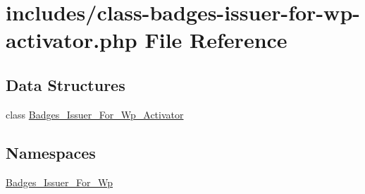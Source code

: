 \hypertarget{class-badges-issuer-for-wp-activator_8php}{}\section{includes/class-\/badges-\/issuer-\/for-\/wp-\/activator.php File Reference}
\label{class-badges-issuer-for-wp-activator_8php}
\subsection*{Data Structures}
\begin{DoxyCompactItemize}
\item 
class \hyperlink{class_badges___issuer___for___wp___activator}{Badges\+\_\+\+Issuer\+\_\+\+For\+\_\+\+Wp\+\_\+\+Activator}
\end{DoxyCompactItemize}
\subsection*{Namespaces}
\begin{DoxyCompactItemize}
\item 
 \hyperlink{namespace_badges___issuer___for___wp}{Badges\+\_\+\+Issuer\+\_\+\+For\+\_\+\+Wp}
\end{DoxyCompactItemize}
